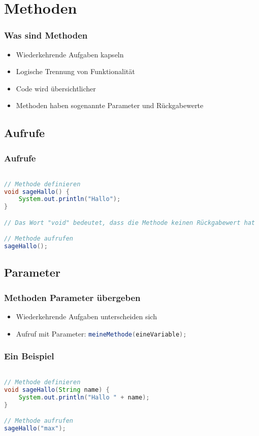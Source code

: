 \documentclass{beamer}
\begin{document}
\section{Methoden}
\begin{frame}[fragile]
	\frametitle{Was sind Methoden}
	\begin{itemize}
		\item Wiederkehrende Aufgaben kapseln
		\item Logische Trennung von Funktionalit\"at
		\item Code wird \"ubersichtlicher
		\item Methoden haben sogenannte Parameter und R\"uckgabewerte
	\end{itemize}
\end{frame}

\subsection{Aufrufe}
\begin{frame}[fragile]
\frametitle{Aufrufe}
	
	
\begin{lstlisting}[language=java]

// Methode definieren
void sageHallo() {
	System.out.println("Hallo");	
}

// Das Wort "void" bedeutet, dass die Methode keinen Rückgabewert hat

// Methode aufrufen
sageHallo();

	\end{lstlisting}
\end{frame}

\subsection{Parameter}
\begin{frame}[fragile]
	\frametitle{Methoden Parameter \"ubergeben}
	\begin{itemize}
		\item Wiederkehrende Aufgaben unterscheiden sich
		\item Aufruf mit Parameter: \lstinline[language=java]{meineMethode(eineVariable);}
	\end{itemize}
\end{frame}

\begin{frame}[fragile]
	\frametitle{Ein Beispiel}
		
	\begin{lstlisting}[language=java]

// Methode definieren
void sageHallo(String name) {
	System.out.println("Hallo " + name);	
}

// Methode aufrufen
sageHallo("max");

	\end{lstlisting}
\end{frame}
\end{document}
